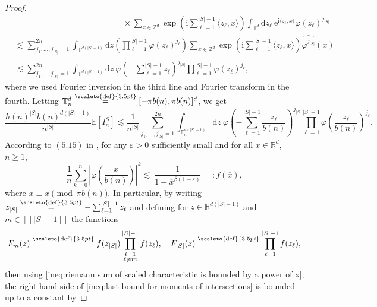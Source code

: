 \documentclass[12pt]{article}
\newcommand{\RR}{\mathbb R}
\newcommand{\EE}{\mathbb E}
\newcommand{\TT}{\mathbb T}
\newcommand{\1}{\mathds{1}}
\newcommand{\ZZ}{\mathbb Z}
\renewcommand{\d}{\mathrm d}
\renewcommand{\i}{\mathrm i}
\newcommand{\eqdef}{\stackrel{\scaleto{\mathrm{def}}{3.5pt}}{=}}
\numberwithin{equation}{section}
\begin{document}
\begin{proof}
\begin{align*}
        &\hspace{13em}\times\sum_{x\in\ZZ^d}\exp\left(\i\sum_{\ell=1}^{|S|-1}\langle z_\ell, x\rangle\right)\int_{\TT^d}\d z_{\ell}\ \mathrm e^{\i\langle z_\ell,x\rangle}\varphi(z_\ell)^{j_{|S|}}\\
        &\lesssim\sum_{j_1,\dots,j_{|S|}=1}^{2n}\int_{\TT^{d(|S|-1)}}\d z\left(\prod_{\ell=1}^{|S|-1}\varphi(z_\ell)^{j_\ell}\right)\sum_{x\in\ZZ^d}\exp\left(\i\sum_{\ell=1}^{|S|-1}\langle z_\ell,x\rangle\right)\widehat{\varphi^{j_{|S|}}}(x)\\
        &\lesssim\sum_{j_1,\dots,j_{|S|}=1}^{2n}\int_{\TT^{d(|S|-1)}}\d z\ \varphi\left(-\sum_{\ell=1}^{|S|-1}z_\ell\right)^{j_{|S|}}\prod_{\ell=1}^{|S|-1}\varphi(z_\ell)^{j_\ell},
    \end{align*}
    where we used Fourier inversion in the third line and Fourier transform in the fourth. Letting $\TT_n^d\eqdef[-\pi b(n),\pi b(n)]^d$, we get
    \begin{equation}
    \label{ineq:last bound for moments of intersections}
        \frac{h(n)^{|S|}b(n)^{d(|S|-1)}}{n^{|S|}}\EE\left[I_n^S\right]\lesssim\frac{1}{n^{|S|}}\sum_{j_1,\dots,j_{|S|}=1}^{2n}\int_{\TT_n^{d(|S|-1)}}\d z\ \varphi\left(-\sum_{\ell=1}^{|S|-1}\frac{z_\ell}{b(n)}\right)^{j_{|S|}}\prod_{\ell=1}^{|S|-1}\varphi\left(\frac{z_\ell}{b(n)}\right)^{j_\ell}.
    \end{equation}
    According to $(5.15)$ in \cite{RosenRandomWalks&IntersectionLocalTimes1990}, for any $\varepsilon>0$ sufficiently small and for all $x\in\RR^d$, $n\ge1$,
    \begin{equation}
    \label{ineq:riemann sum of scaled characteristic is bounded by a power of x}
        \frac{1}{n}\sum_{k=0}^n\left|\varphi\left(\frac{x}{b(n)}\right)\right|^k\lesssim\ \frac{1}{1+\overline x^{\beta(1-\varepsilon)}}=:f(\overline x),
    \end{equation}
    where $\overline{x}\equiv x\pmod{\pi b(n)} $. In particular, by writing $z_{|S|}\eqdef-\sum_{\ell=1}^{|S|-1}z_\ell$ and defining for $z\in\RR^{d(|S|-1)}$ and $m\in[\![|S|-1]\!]$ the functions
    \begin{equation*}
        F_m(z)\eqdef f(z_{|S|})\prod_{\substack{\ell=1 \\ \ell\ne m}}^{|S|-1}f(z_\ell),\quad  
        F_{|S|}(z)\eqdef\prod_{\ell=1}^{|S|-1}f(z_\ell),
    \end{equation*}
    then using \eqref{ineq:riemann sum of scaled characteristic is bounded by a power of x}, the right hand side of \eqref{ineq:last bound for moments of intersections} is bounded up to a constant by 

\end{proof}
\end{document}
